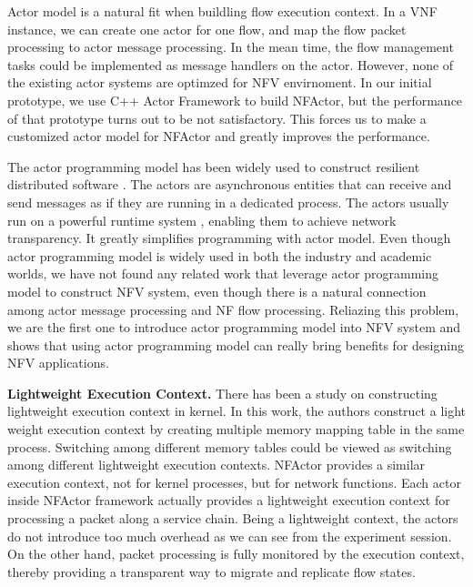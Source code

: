 Actor model is a natural fit when buildling flow execution context. In a VNF instance, we can create one actor for one flow, and map the flow packet processing to actor message processing. In the mean time, the flow management tasks could be implemented as message handlers on the actor. However, none of the existing actor systems are optimzed for NFV envirnoment. In our initial prototype, we use C++ Actor Framework \cite{caf} to build NFActor, but the performance of that prototype turns out to be not satisfactory. This forces us to make a customized actor model for NFActor and greatly improves the performance.

The actor programming model has been widely used to construct resilient distributed software \cite{erlang, akka, Orleans, caf}. The actors are asynchronous entities that can receive and send messages as if they are running in a dedicated process. The actors usually run on a powerful runtime system \cite{erlang, akka, caf}, enabling them to achieve network transparency. It greatly simplifies programming with actor model. Even though actor programming model is widely used in both the industry and academic worlds, we have not found any related work that leverage actor programming model to construct NFV system, even though there is a natural connection among actor message processing and NF flow processing. Reliazing this problem, we are the first one to introduce actor programming model into NFV system and shows that using actor programming model can really bring benefits for designing NFV applications.

\textbf{Lightweight Execution Context. } There has been a study on constructing lightweight execution context \cite{litton2016light} in kernel. In this work, the authors construct a light weight execution context by creating multiple memory mapping table in the same process. Switching among different memory tables could be viewed as switching among different lightweight execution contexts. NFActor provides a similar execution context, not for kernel processes, but for network functions. Each actor inside NFActor framework actually provides a lightweight execution context for processing a packet along a service chain. Being a lightweight context, the actors do not introduce too much overhead as we can see from the experiment session. On the other hand, packet processing is fully monitored by the execution context, thereby providing a transparent way to migrate and replicate flow states.
